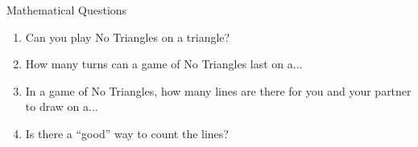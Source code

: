\documentclass{article}
\begin{document}
    \hrulefill

    \bigskip
    \begin{Large}Mathematical Questions\end{Large}

    \begin{enumerate}
        \item Can you play No Triangles on a triangle? %
        \item How many turns can a game of No Triangles last on a...\\ %
        \item In a game of No Triangles, how many lines are there for you and your partner to draw on a...\\
        \item Is there a ``good'' way to count the lines? 

\end{enumerate}
\end{document}
